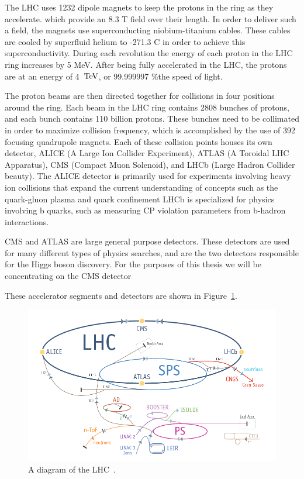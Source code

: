 The LHC uses 1232 dipole magnets to keep the protons in the ring as they accelerate. which provide an 8.3 T field over their length.  
In order to deliver such a field, the magnets use superconducting niobium-titanium cables.  
These cables are cooled by superfluid helium to -271.3 C in order to achieve this superconductivity.  
During each revolution the energy of each proton in the LHC ring increases by 5 MeV.  
After being fully accelerated in the LHC, the protons are at an energy of 4~$\mathrm{TeV}$, or 99.999997 \%the speed of light.

The proton beams are then directed together for collisions in four positions around the ring.  
Each beam in the LHC ring contains 2808 bunches of protons, and each bunch contains 110 billion protons. 
These bunches need to be collimated in order to maximize collision frequency, which is accomplished by the use of 392 focusing quadrupole magnets.   
Each of these collision points houses its own detector, ALICE (A Large Ion Collider Experiment), ATLAS (A Toroidal LHC Apparatus), 
CMS (Compact Muon Solenoid), and LHCb (Large Hadron Collider beauty).  
The ALICE detector is primarily used for experiments involving heavy ion collisions that expand the current 
understanding of concepts such as the quark-gluon plasma and quark confinement   
LHCb is specialized for physics involving b quarks, such as measuring CP violation parameters from b-hadron interactions.  

CMS and ATLAS are large general purpose detectors.  
These detectors are used for many different types of physics searches, and are the two detectors responsible for the Higgs boson discovery.  
For the purposes of this thesis we will be concentrating on the CMS detector
  
These accelerator segments and detectors are shown in Figure~\ref{figs:lhc}.

\begin{figure}
\begin{center}
\includegraphics[width=1.0\linewidth]{figs/lhc.png}
\caption{A diagram of the LHC~\cite{lhcbrochure}.}
\label{figs:lhc}
\end{center}
\end{figure}

